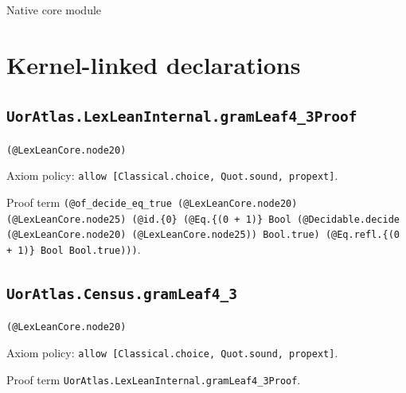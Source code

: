 \documentclass[11pt]{article}
\begin{document}
\begin{center}{\LARGE Native core module}\end{center}
\section*{Kernel-linked declarations}
\subsection*{\texttt{UorAtlas.LexLeanInternal.gramLeaf4\_3Proof}}
\noindent\texttt{(@LexLeanCore.node20)}\par
\noindent Axiom policy: \texttt{allow [Classical.choice, Quot.sound, propext]}.\par
\noindent Proof term \texttt{(@of\_decide\_eq\_true (@LexLeanCore.node20) (@LexLeanCore.node25) (@id.\{0\} (@Eq.\{(0 + 1)\} Bool (@Decidable.decide (@LexLeanCore.node20) (@LexLeanCore.node25)) Bool.true) (@Eq.refl.\{(0 + 1)\} Bool Bool.true)))}.\par
\subsection*{\texttt{UorAtlas.Census.gramLeaf4\_3}}
\noindent\texttt{(@LexLeanCore.node20)}\par
\noindent Axiom policy: \texttt{allow [Classical.choice, Quot.sound, propext]}.\par
\noindent Proof term \texttt{UorAtlas.LexLeanInternal.gramLeaf4\_3Proof}.\par
\end{document}
